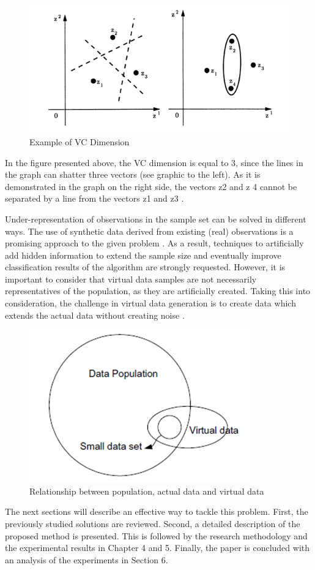 \documentclass[parskip=full]{scrartcl}
\begin{document}
\begin{figure}[h]
	\centering
	\includegraphics[width=0.6\linewidth]{"./resources/vc_dimension"}
	\caption{Example of VC Dimension \cite{Vapnik.2008}}
	\label{fig:vc-dimension}
\end{figure}

In the figure presented above, the VC dimension is equal to 3, since the lines
in the graph can shatter three vectors (see graphic to the left). As it is
demonstrated in the graph on the right side, the vectors z{\tiny 2} and z{\tiny
4} cannot be separated by a line from the vectors z{\tiny 1} and z{\tiny 3}
\cite{Vapnik.2008}.

Under-representation of observations in the sample set can be solved in different ways. The use of synthetic data derived from existing (real) observations is a promising approach to the given problem \cite{Sezer.2014}. As a result, techniques to artificially add hidden information to extend the sample size and eventually improve classification results of the algorithm are strongly requested. However, it is important to consider that virtual data samples are not necessarily representatives of the population, as they are artificially created. Taking this into consideration, the challenge in virtual data generation is to create data which extends the actual data without creating noise \cite{Li.2006}. 

\begin{figure}[h]
	\centering
	\includegraphics[width=0.35\linewidth]{./Resources/relationship}
	\caption{Relationship between population, actual data and virtual data \cite{Li.2006}}
	\label{fig:relationship}
\end{figure}

The next sections will describe an effective way to tackle this problem. First,
the previously studied solutions are reviewed. Second, a detailed description of the proposed method is presented. This is followed by the research methodology and the experimental results in Chapter 4 and 5. Finally, the paper is concluded with an analysis of the experiments in Section 6.
\end{document}
